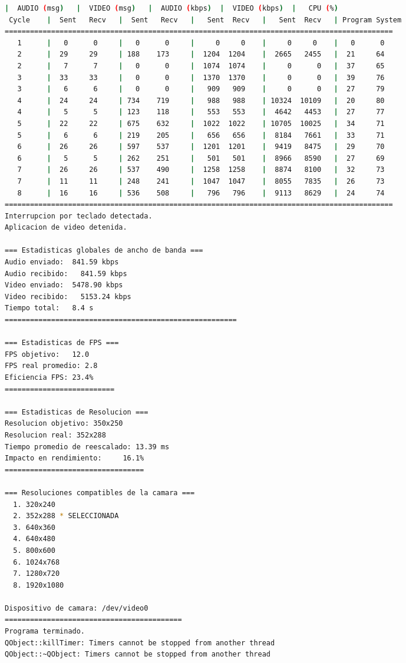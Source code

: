\begin{adjustbox}{max width=\textwidth}
\begin{lstlisting}[language=bash,basicstyle=\ttfamily\scriptsize]
          |  AUDIO (msg)   |  VIDEO (msg)   |  AUDIO (kbps)  |  VIDEO (kbps)  |   CPU (%)
 Cycle    |  Sent   Recv   |  Sent   Recv   |   Sent  Recv   |   Sent  Recv   | Program System
============================================================================================
   1      |   0      0     |   0      0     |     0     0    |     0     0    |   0      0
   2      |  29     29     | 188    173     |  1204  1204    |  2665   2455   |  21     64
   2      |   7      7     |   0      0     |  1074  1074    |     0      0   |  37     65
   3      |  33     33     |   0      0     |  1370  1370    |     0      0   |  39     76
   3      |   6      6     |   0      0     |   909   909    |     0      0   |  27     79
   4      |  24     24     | 734    719     |   988   988    | 10324  10109   |  20     80
   4      |   5      5     | 123    118     |   553   553    |  4642   4453   |  27     77
   5      |  22     22     | 675    632     |  1022  1022    | 10705  10025   |  34     71
   5      |   6      6     | 219    205     |   656   656    |  8184   7661   |  33     71
   6      |  26     26     | 597    537     |  1201  1201    |  9419   8475   |  29     70
   6      |   5      5     | 262    251     |   501   501    |  8966   8590   |  27     69
   7      |  26     26     | 537    490     |  1258  1258    |  8874   8100   |  32     73
   7      |  11     11     | 248    241     |  1047  1047    |  8055   7835   |  26     73
   8      |  16     16     | 536    508     |   796   796    |  9113   8629   |  24     74
============================================================================================
Interrupcion por teclado detectada.
Aplicacion de video detenida.

=== Estadisticas globales de ancho de banda ===
Audio enviado:	841.59 kbps
Audio recibido:   841.59 kbps
Video enviado:	5478.90 kbps
Video recibido:   5153.24 kbps
Tiempo total: 	8.4 s
=======================================================

=== Estadisticas de FPS ===
FPS objetivo: 	12.0
FPS real promedio: 2.8
Eficiencia FPS:	23.4%
==========================

=== Estadisticas de Resolucion ===
Resolucion objetivo: 350x250
Resolucion real: 352x288
Tiempo promedio de reescalado: 13.39 ms
Impacto en rendimiento:    	16.1%
=================================

=== Resoluciones compatibles de la camara ===
  1. 320x240
  2. 352x288 * SELECCIONADA
  3. 640x360
  4. 640x480
  5. 800x600
  6. 1024x768
  7. 1280x720
  8. 1920x1080

Dispositivo de camara: /dev/video0
==========================================
Programa terminado.
QObject::killTimer: Timers cannot be stopped from another thread
QObject::~QObject: Timers cannot be stopped from another thread
\end{lstlisting}
\end{adjustbox}
\vspace{\baselineskip}

